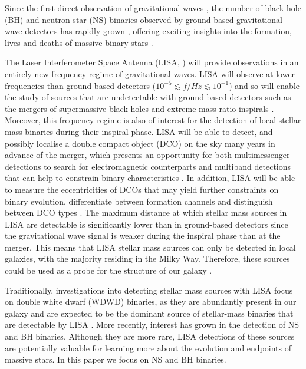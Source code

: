Since the first direct observation of gravitational waves \citep{Abbott+2016_first_detection}, the number of black hole (BH) and neutron star (NS) binaries observed by ground-based gravitational-wave detectors has rapidly grown \citep{Abbott+2019_GWTC1,Abbott+2020_GWTC2}, offering exciting insights into the formation, lives and deaths of massive binary stars \citep[e.g.][]{Abbott+2021_GWTC2_inference}.


The Laser Interferometer Space Antenna (LISA, \citealp{Amaro-Seoane+2017}) will provide observations in an entirely new frequency regime of gravitational waves. LISA will observe at lower frequencies than ground-based detectors ($10^{-5} \lesssim f / \unit{Hz} \lesssim 10^{-1}$) and so will enable the study of sources that are undetectable with ground-based detectors such as the mergers of supermassive black holes and extreme mass ratio inspirals \citep[e.g.][]{Begelman+1980, Klein+2016}. Moreover, this frequency regime is also of interest for the detection of local stellar mass binaries during their inspiral phase. LISA will be able to detect, and possibly localise a double compact object (DCO) on the sky many years in advance of the merger, which presents an opportunity for both multimessenger detections to search for electromagnetic counterparts and multiband detections that can help to constrain binary characteristics \citep[e.g.][]{Sesana+2016, Gerosa+2019}. In addition, LISA will be able to measure the eccentricities of DCOs that may yield further constraints on binary evolution, differentiate between formation channels and distinguish between DCO types \citep[e.g.][]{Nelemans+2001, Breivik+2016, Antonini+2017, Rodriguez+2018}. The maximum distance at which stellar mass sources in LISA are detectable is significantly lower than in ground-based detectors since the gravitational wave signal is weaker during the inspiral phase than at the merger. This means that LISA stellar mass sources can only be detected in local galaxies, with the majority residing in the Milky Way. Therefore, these sources could be used as a probe for the structure of our galaxy \citep[e.g.][]{Korol+2019}.

Traditionally, investigations into detecting stellar mass sources with LISA focus on double white dwarf (WDWD) binaries, as they are abundantly present in our galaxy and are expected to be the dominant source of stellar-mass binaries that are detectable by LISA \citep{Nelemans+2001,Ruiter+2010,Yu+2010,Nissanke+2012,Korol+2017,Lamberts+2018}. More recently, interest has grown in the detection of NS and BH binaries. Although they are more rare, LISA detections of these sources are potentially valuable for learning more about the evolution and endpoints of massive stars. In this paper we focus on NS and BH binaries.

